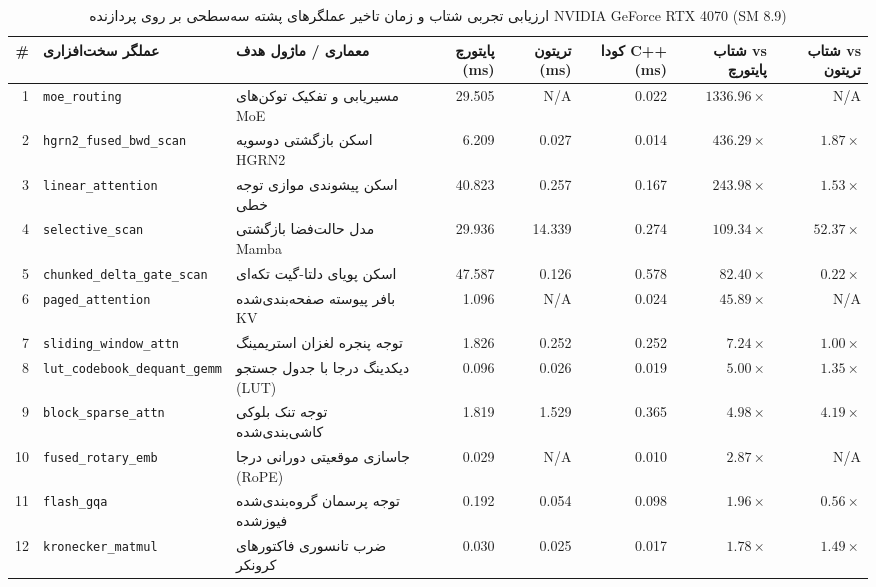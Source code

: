 \documentclass[12pt,a4paper]{report}
\theoremstyle{definition}
\begin{document}
\begin{table}[H]
\centering
\caption{ارزیابی تجربی شتاب و زمان تاخیر عملگرهای پشته سه‌سطحی بر روی پردازنده NVIDIA GeForce RTX 4070 (SM 8.9)}
\label{tab:18_native_cuda_kernels_3level_persian}
\scriptsize
\setlength{\tabcolsep}{3.5pt}
\begin{tabular}{rllrrrrr}
\toprule
\textbf{\#} & \textbf{عملگر سخت‌افزاری} & \textbf{معماری / ماژول هدف} & \textbf{پایتورچ (ms)} & \textbf{تریتون (ms)} & \textbf{کودا C++ (ms)} & \textbf{شتاب vs پایتورچ} & \textbf{شتاب vs تریتون} \\
\midrule
1 & \texttt{moe\_routing} & مسیریابی و تفکیک توکن‌های MoE & 29.505 & N/A & 0.022 & $\mathbf{1336.96\times}$ & N/A \\
2 & \texttt{hgrn2\_fused\_bwd\_scan} & اسکن بازگشتی دوسویه HGRN2 & 6.209 & 0.027 & 0.014 & $\mathbf{436.29\times}$ & $\mathbf{1.87\times}$ \\
3 & \texttt{linear\_attention} & اسکن پیشوندی موازی توجه خطی & 40.823 & 0.257 & 0.167 & $\mathbf{243.98\times}$ & $\mathbf{1.53\times}$ \\
4 & \texttt{selective\_scan} & مدل حالت‌فضا بازگشتی Mamba & 29.936 & 14.339 & 0.274 & $\mathbf{109.34\times}$ & $\mathbf{52.37\times}$ \\
5 & \texttt{chunked\_delta\_gate\_scan} & اسکن پویای دلتا-گیت تکه‌ای & 47.587 & 0.126 & 0.578 & $\mathbf{82.40\times}$ & $0.22\times$ \\
6 & \texttt{paged\_attention} & بافر پیوسته صفحه‌بندی‌شده KV & 1.096 & N/A & 0.024 & $\mathbf{45.89\times}$ & N/A \\
7 & \texttt{sliding\_window\_attn} & توجه پنجره لغزان استریمینگ & 1.826 & 0.252 & 0.252 & $\mathbf{7.24\times}$ & $1.00\times$ \\
8 & \texttt{lut\_codebook\_dequant\_gemm} & دیکدینگ درجا با جدول جستجو (LUT) & 0.096 & 0.026 & 0.019 & $\mathbf{5.00\times}$ & $\mathbf{1.35\times}$ \\
9 & \texttt{block\_sparse\_attn} & توجه تنک بلوکی کاشی‌بندی‌شده & 1.819 & 1.529 & 0.365 & $\mathbf{4.98\times}$ & $\mathbf{4.19\times}$ \\
10 & \texttt{fused\_rotary\_emb} & جاسازی موقعیتی دورانی درجا (RoPE) & 0.029 & N/A & 0.010 & $\mathbf{2.87\times}$ & N/A \\
11 & \texttt{flash\_gqa} & توجه پرسمان گروه‌بندی‌شده فیوزشده & 0.192 & 0.054 & 0.098 & $\mathbf{1.96\times}$ & $0.56\times$ \\
12 & \texttt{kronecker\_matmul} & ضرب تانسوری فاکتورهای کرونکر & 0.030 & 0.025 & 0.017 & $\mathbf{1.78\times}$ & $\mathbf{1.49\times}$ \\

\end{tabular}
\end{table}
\end{document}
